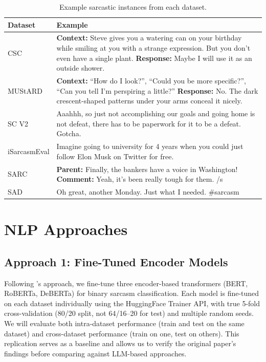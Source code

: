 \documentclass[sigconf, nonacm]{acmart}
\begin{document}
\begin{table}[t]
\centering
\caption{Example sarcastic instances from each dataset.}
\label{tab:examples}
\small
\begin{tabular}{p{2cm}p{13.5cm}}
\toprule
\textbf{Dataset} & \textbf{Example} \\
\midrule
CSC &
\textbf{Context:} Steve gives you a watering can on your birthday
while smiling at you with a strange expression. But you don't even
have a single plant. \newline
\textbf{Response:} Maybe I will use it as an outside shower. \\
\midrule
MUStARD &
\textbf{Context:} ``How do I look?'', ``Could you be more
specific?'', ``Can you tell I'm perspiring a little?'' \newline
\textbf{Response:} No. The dark crescent-shaped patterns under
your arms conceal it nicely. \\
\midrule
SC V2 &
Aaahhh, so just not accomplishing our goals and going home is not
defeat, there has to be paperwork for it to be a defeat. Gotcha. \\
\midrule
iSarcasmEval &
Imagine going to university for 4 years when you could just follow
Elon Musk on Twitter for free. \\
\midrule
SARC &
\textbf{Parent:} Finally, the bankers have a voice in Washington!
\newline
\textbf{Comment:} Yeah, it's been really tough for them. /s \\
\midrule
SAD &
Oh great, another Monday. Just what I needed. \#sarcasm \\
\bottomrule
\end{tabular}
\end{table}

\section{NLP Approaches}

\subsection{Approach 1: Fine-Tuned Encoder Models}

Following \cite{jang2024generalizablesarcasmdetectionjust}'s approach, we fine-tune three encoder-based transformers (BERT, RoBERTa, DeBERTa) for binary sarcasm classification. Each model is fine-tuned on each dataset individually using the HuggingFace Trainer API, with true 5-fold cross-validation (80/20 split, not 64/16--20 for test) and multiple random seeds. We will evaluate both intra-dataset performance (train and test on the same dataset) and cross-dataset performance (train on one, test on others). This replication serves as a baseline and allows us to verify the original paper's findings before comparing against LLM-based approaches.
\end{document}
